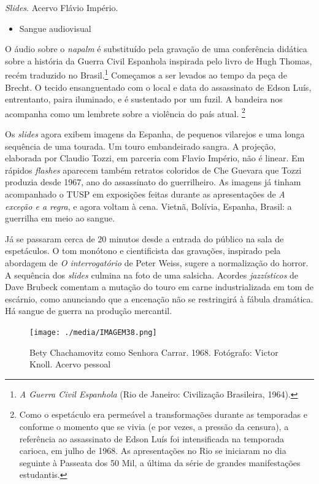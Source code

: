\textit{Slides}. Acervo Flávio Império.

\begin{itemize}
\item
  Sangue audiovisual
\end{itemize}

O áudio sobre o \textit{napalm} é substituído pela gravação de uma
conferência didática sobre a história da Guerra Civil Espanhola
inspirada pelo livro de Hugh Thomas, recém traduzido no
Brasil.\footnote{\textit{A Guerra Civil Espanhola} (Rio de Janeiro:
  Civilização Brasileira, 1964).} Começamos a ser levados ao tempo da
peça de Brecht. O tecido ensanguentado com o local e data do assassinato
de Edson Luís, entrentanto, paira iluminado, e é sustentado por um
fuzil. A bandeira nos acompanha como um lembrete sobre a violência do
país atual. \footnote{Como o espetáculo era permeável a transformações
  durante as temporadas e conforme o momento que se vivia (e por vezes,
  a pressão da censura), a referência ao assassinato de Edson Luís foi
  intensificada na temporada carioca, em julho de 1968. As apresentações
  no Rio se iniciaram no dia seguinte à Passeata dos 50 Mil, a última da
  série de grandes manifestações estudantis.}

Os \textit{slides} agora exibem imagens da Espanha, de pequenos vilarejos e
uma longa sequência de uma tourada. Um touro embandeirado sangra. A
projeção, elaborada por Claudio Tozzi, em parceria com Flavio Império,
não é linear. Em rápidos \textit{flashes} aparecem também retratos
coloridos de Che Guevara que Tozzi produzia desde 1967, ano do
assassinato do guerrilheiro. As imagens já tinham acompanhado o TUSP em
exposições feitas durante as apresentações de \textit{A exceção e a regra},
e agora voltam à cena. Vietnã, Bolívia, Espanha, Brasil: a guerrilha em
meio ao sangue.

Já se passaram cerca de 20 minutos desde a entrada do público na sala de
espetáculos. O tom monótono e cientificista das gravações, inspirado
pela abordagem de \textit{O interrogatório} de Peter Weiss, sugere a
normalização do horror. A sequência dos \textit{slides} culmina na foto de
uma salsicha. Acordes \textit{jazzísticos} de Dave Brubeck comentam a
mutação do touro em carne industrializada em tom de escárnio, como
anunciando que a encenação não se restringirá à fábula dramática. Há
sangue de guerra na produção mercantil.

\begin{figure}
\texttt{[image: ./media/IMAGEM38.png]}
\caption{Bety Chachamovitz como Senhora Carrar. 1968. Fotógrafo: Victor Knoll.
Acervo pessoal}
\end{figure}

